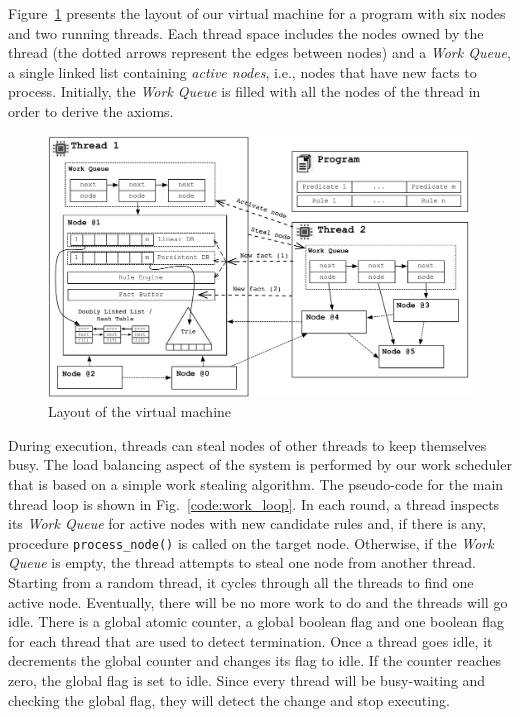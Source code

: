 \documentclass{sigplanconf}
\begin{document}
Figure~\ref{fig:overview} presents the layout of our virtual machine
for a program with six nodes and two running threads. Each thread
space includes the nodes owned by the thread (the dotted arrows
represent the edges between nodes) and a \emph{Work Queue}, a single
linked list containing \emph{active nodes}, i.e., nodes that have new
facts to process. Initially, the \emph{Work Queue} is filled with all
the nodes of the thread in order to derive the axioms.

\begin{figure}[t]
\centering
\includegraphics[width=\textwidth]{figures/overview.pdf}
\caption{Layout of the virtual machine}
\label{fig:overview}
\end{figure}

During execution, threads can steal nodes of other threads to keep
themselves busy. The load balancing aspect of the system is performed
by our work scheduler that is based on a simple work stealing
algorithm. The pseudo-code for the main thread loop is shown in
Fig.~\ref{code:work_loop}. In each round, a thread inspects its \emph{Work Queue}
for active nodes with new candidate rules and, if there is any,
procedure \texttt{process\_node()} is called on the target node.
Otherwise, if the \emph{Work Queue} is empty, the thread attempts to
steal one node from another
thread. Starting from a random thread, it cycles through all the
threads to find one active node. Eventually, there will be no more
work to do and the threads will go idle. There is a global atomic
counter, a global boolean flag and one boolean flag for each thread
that are used to detect termination. Once a thread goes idle, it
decrements the global counter and changes its flag to idle. If the
counter reaches zero, the global flag is set to idle. Since every
thread will be busy-waiting and checking the global flag, they will
detect the change and stop executing.
\end{document}
